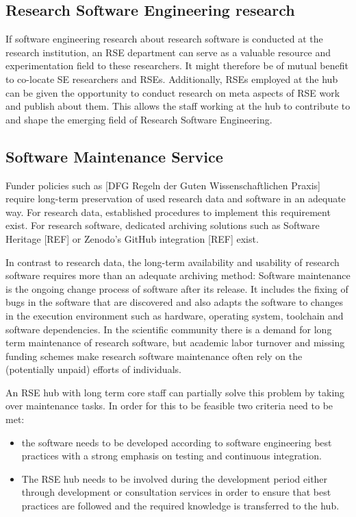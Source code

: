 \documentclass{article}
\begin{document}
\subsection{Research Software Engineering research}

If software engineering research about research software is conducted at the research institution, an RSE department can serve as a valuable resource and experimentation field to these researchers. It might therefore be of mutual benefit to co-locate SE researchers and RSEs.
Additionally, RSEs employed at the hub can be given the opportunity to conduct research on meta aspects of RSE work and publish about them.
This allows the staff working at the hub to contribute to and shape the emerging field of Research Software Engineering.

\subsection{Software Maintenance Service}

Funder policies such as [DFG Regeln der Guten Wissenschaftlichen Praxis] require long-term preservation of used research data and software in an adequate way.
For research data, established procedures to implement this requirement exist.
For research software, dedicated archiving solutions such as Software Heritage [REF] or Zenodo's GitHub integration [REF] exist.

In contrast to research data, the long-term availability and usability of research software requires more than an adequate archiving method:
Software maintenance is the ongoing change process of software after its release.
It includes the fixing of bugs in the software that are discovered and also adapts the software to changes in the execution environment such as hardware, operating system, toolchain and software dependencies. In the scientific community there is a demand for long term maintenance of research software, but academic labor turnover and missing funding schemes make research software maintenance often rely on the (potentially unpaid) efforts of individuals.

An RSE hub with long term core staff can partially solve this problem by taking over maintenance tasks.
In order for this to be feasible two criteria need to be met:
\begin{itemize}
\item the software needs to be developed according to software engineering best practices with a strong emphasis on testing and continuous integration.
\item The RSE hub needs to be involved during the development period either through development or consultation services in order to ensure that best practices are followed and the required knowledge is transferred to the hub.
\end{itemize}
\end{document}
